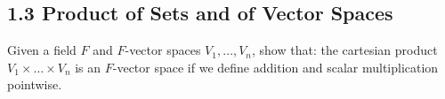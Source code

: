 \subsection*{1.3 Product of Sets and of Vector Spaces}
\item Given a field $F$ and $F$-vector spaces $V_{1}, \dots, V_{n}$, show that: the cartesian product $V_{1} \times \dots \times V_{n}$ is an $F$-vector space if we define addition and scalar multiplication pointwise.
